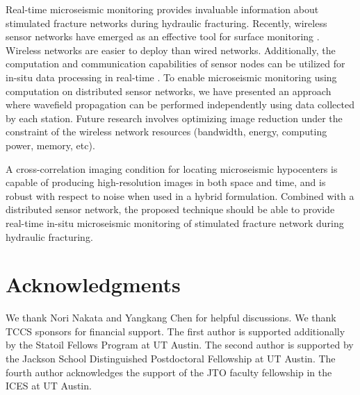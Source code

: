 Real-time microseismic monitoring provides invaluable information about stimulated fracture networks during hydraulic fracturing. Recently, wireless sensor networks have emerged as an effective tool for surface monitoring \cite[]{SHXM-MOBISYS2009}. Wireless networks are easier to deploy than wired networks. Additionally, the computation and communication capabilities of sensor nodes can be utilized for in-situ data processing in real-time \cite[]{KSS-DCOSS2013,SLK-SEG2015}. To enable microseismic monitoring using computation on distributed sensor networks, we have presented an approach where wavefield propagation can be performed independently using data collected by each station. Future research involves optimizing image reduction under the constraint of the wireless network resources (bandwidth, energy, computing power, memory, etc).

A cross-correlation imaging condition for locating microseismic hypocenters is capable of producing high-resolution images in both space and time, and is robust with respect to noise when used in a hybrid formulation. Combined with a distributed sensor network, the proposed technique should be able to provide real-time in-situ microseismic monitoring of stimulated fracture network during hydraulic fracturing.

\section{Acknowledgments}
We thank Nori Nakata and Yangkang Chen for helpful discussions. We thank TCCS sponsors for financial support. The first author is supported additionally by the Statoil Fellows Program at UT Austin. The second author is supported by the Jackson School Distinguished Postdoctoral Fellowship at UT Austin. The fourth author acknowledges the support of the JTO faculty fellowship in the ICES at UT Austin.




